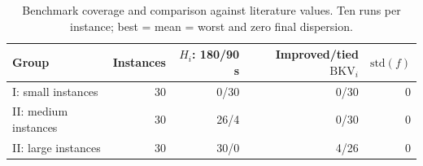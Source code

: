 \begin{table}[tbp]\centering\small
\caption{Benchmark coverage and comparison against literature values. Ten runs per instance; best = mean = worst and zero final dispersion.}
\label{tab:cohort-results}
\begin{tabular}{lrrrr}
\toprule
Group & Instances & $H_i$: 180/90 s & Improved/tied $\mathrm{BKV}_i$ & $\mathrm{std}(f)$\\
\midrule
I: small instances & 30 & 0/30 & 0/30 & 0\\
II: medium instances & 30 & 26/4 & 0/30 & 0\\
II: large instances & 30 & 30/0 & 4/26 & 0\\
\bottomrule\end{tabular}
\end{table}
